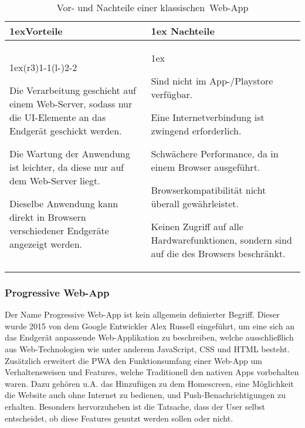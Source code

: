 \begin{table}[h]
	\begin{tabularx}{\linewidth}{>{\parskip1ex}X@{\kern4\tabcolsep}>{\parskip1ex}X}
		\toprule
		\hfil\bfseries Vorteile
		&
		\hfil\bfseries Nachteile
		\\\cmidrule(r{3\tabcolsep}){1-1}\cmidrule(l{-\tabcolsep}){2-2}
		
		Die Verarbeitung geschieht auf einem Web-Server, sodass nur die \ac{UI}-Elemente an das Endgerät geschickt werden.\par
		Die Wartung der Anwendung ist leichter, da diese nur auf dem Web-Server liegt.\par
		Dieselbe Anwendung kann direkt in Browsern verschiedener Endgeräte angezeigt werden.\par
		
		&
		
		Sind nicht im App-/Playstore verfügbar.\par
		Eine Internetverbindung ist zwingend erforderlich.\par
		Schwächere Performance, da in einem Browser ausgeführt.\par
		Browserkompatibilität nicht überall gewährleistet.\par
		Keinen Zugriff auf alle Hardwarefunktionen, sondern sind auf die des Browsers beschränkt.\par
		\\\bottomrule
	\end{tabularx}
	\caption{Vor- und Nachteile einer \glqq klassischen\grqq\ Web-App}
\end{table}

\newpage
\subsubsection{Progressive Web-App}

Der Name Progressive Web-App ist kein allgemein definierter Begriff. Dieser wurde 2015  von dem Google Entwickler Alex Russell eingeführt, um eine sich an das Endgerät anpassende Web-Applikation zu beschreiben, welche ausschließlich aus Web-Technologien wie unter anderem JavaScript, \ac{CSS} und \ac{HTML} besteht. Zusätzlich erweitert die \ac{PWA} den Funktionsumfang einer Web-App um Verhaltensweisen und Features, welche Traditionell den nativen Apps vorbehalten waren. Dazu gehören u.A. das Hinzufügen zu dem Homescreen, eine Möglichkeit die Website auch ohne Internet zu bedienen, und Push-Benachrichtigungen zu erhalten\cite{mozilla_pwa}. Besonders hervorzuheben ist die Tatsache, dass der User selbst entscheidet, ob diese Features genutzt werden sollen oder nicht. 

